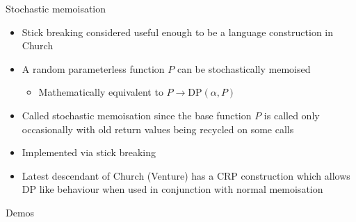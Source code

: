 \begin{frame}{Stochastic memoisation}
  \begin{itemize}
    \item Stick breaking considered useful enough to be a language construction  in Church
    \vspace{\baselineskip}
    \item A random parameterless function $P$ can be stochastically memoised
    \begin{itemize}
      \item Mathematically equivalent to $P \to \textrm{DP}(\alpha, P)$
    \end{itemize}
    \vspace{\baselineskip}
    \item Called stochastic memoisation since the base function $P$ is called only occasionally with old return values being recycled on some calls
    \vspace{\baselineskip}
    \item Implemented via stick breaking 
    \vspace{\baselineskip}
    \item Latest descendant of Church (Venture) has a CRP construction which allows DP like behaviour when used in conjunction with normal memoisation
  \end{itemize}
\end{frame}

\begin{frame}{Demos}

\end{frame}


